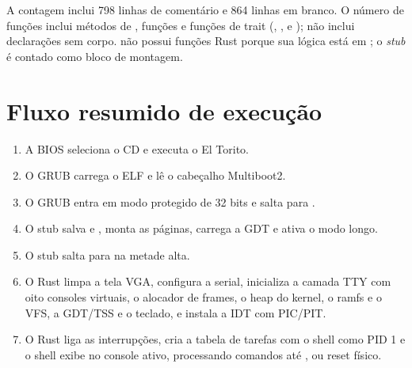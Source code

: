 \begin{nota}
A contagem inclui 798 linhas de coment\'ario e 864 linhas em branco. O n\'umero
de fun\c{c}\~oes inclui m\'etodos de , fun\c{c}\~oes 
e fun\c{c}\~oes de trait (, ,  e
); n\~ao inclui declara\c{c}\~oes  sem corpo.
 n\~ao possui fun\c{c}\~oes Rust porque sua l\'ogica est\'a em
; o \emph{stub} \'e contado como bloco de montagem.
\end{nota}

\section{Fluxo resumido de execu\c{c}\~ao}

\begin{enumerate}
  \item A BIOS seleciona o CD e executa o El Torito.
  \item O GRUB carrega o ELF e l\^e o cabe\c{c}alho Multiboot2.
  \item O GRUB entra em modo protegido de 32 bits e salta para .
  \item O stub salva  e , monta as p\'aginas, carrega a
        GDT e ativa o modo longo.
  \item O stub salta para  na metade alta.
  \item O Rust limpa a tela VGA, configura a serial, inicializa a camada TTY
        com oito consoles virtuais, o alocador de frames, o heap do kernel, o
        ramfs e o VFS, a GDT/TSS e o teclado, e instala a IDT com PIC/PIT.
  \item O Rust liga as interrup\c{c}\~oes, cria a tabela de tarefas com o
        shell como PID 1 e o shell exibe  no console ativo,
        processando comandos at\'e ,  ou reset
        f\'isico.
\end{enumerate}
